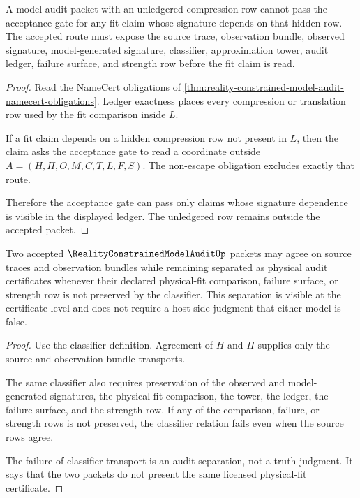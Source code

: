 \begin{theorem}
\label{thm:reality-constrained-model-audit-ledger-nonescape}
A model-audit packet with an unledgered compression row cannot pass the acceptance gate for any fit claim whose signature depends on that hidden row. The accepted route must expose the source trace, observation bundle, observed signature, model-generated signature, classifier, approximation tower, audit ledger, failure surface, and strength row before the fit claim is read.
\end{theorem}
\begin{proof}
Read the NameCert obligations of \autoref{thm:reality-constrained-model-audit-namecert-obligations}. Ledger exactness places every compression or translation row used by the fit comparison inside $L$.

If a fit claim depends on a hidden compression row not present in $L$, then the claim asks the acceptance gate to read a coordinate outside $A=(H,\Pi,O,M,C,T,L,F,S)$. The non-escape obligation excludes exactly that route.

Therefore the acceptance gate can pass only claims whose signature dependence is visible in the displayed ledger. The unledgered row remains outside the accepted packet.
\end{proof}

\begin{theorem}
\label{thm:reality-constrained-model-audit-fit-separation}
Two accepted $\RealityConstrainedModelAuditUp$ packets may agree on source traces and observation bundles while remaining separated as physical audit certificates whenever their declared physical-fit comparison, failure surface, or strength row is not preserved by the classifier. This separation is visible at the certificate level and does not require a host-side judgment that either model is false.
\end{theorem}
\begin{proof}
Use the classifier definition. Agreement of $H$ and $\Pi$ supplies only the source and observation-bundle transports.

The same classifier also requires preservation of the observed and model-generated signatures, the physical-fit comparison, the tower, the ledger, the failure surface, and the strength row. If any of the comparison, failure, or strength rows is not preserved, the classifier relation fails even when the source rows agree.

The failure of classifier transport is an audit separation, not a truth judgment. It says that the two packets do not present the same licensed physical-fit certificate.
\end{proof}

